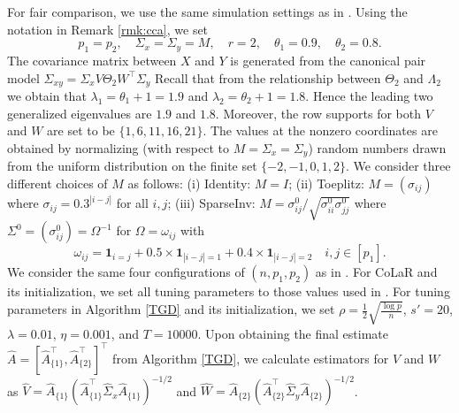 \documentclass[11pt]{article}
\newcommand{\nb}[1]{\textcolor{orange}{\texttt{[#1]}}}
\newcommand{\gsc}[1]{\textcolor{blue}{\texttt{[#1]}}}
\newcommand{\dc}[1]{\{#1\}} %
\newcommand{\hs}{s'}
\newcommand{\0}{{\mathbf{0}}}
\begin{document}
For fair comparison, we use the same simulation settings as in \cite{gao2017sparse}.
Using the notation in Remark \ref{rmk:cca},
we set 
\begin{equation*}
    p_1=p_2,\quad \Sigma_x=\Sigma_y=M,\quad r=2,\quad \theta_1=0.9,\quad \theta_2=0.8.
\end{equation*}
The covariance matrix between $X$ and $Y$ is generated from the canonical pair model $\Sigma_{xy}=\Sigma_xV \Theta_2 W^\top \Sigma_y$ 
{Recall that from the relationship between $\Theta_2$ and $\Lambda_2$ we obtain that $\lambda_1=\theta_1+1=1.9$ and $\lambda_2=\theta_2+1=1.8$. Hence the leading two generalized eigenvalues are $1.9$ and $1.8.$}
Moreover, the row supports for both $V$ and $W$ are set to be $\{1,6,11,16,21\}$. The values at the nonzero coordinates are obtained by normalizing (with respect to $M = \Sigma_x = \Sigma_y$) random numbers drawn from the uniform distribution on the finite set $\{-2,-1,0,1,2\}$. 
We consider three different choices of $M$ as follows: 
(i) Identity: $M=I$; 
(ii) Toeplitz: $M=(\sigma_{ij})$ where $\sigma_{ij}=0.3^{|i-j|}$ for all $i,j$; 
(iii) SparseInv: $M={\sigma^0_{ij}}/{\sqrt{\sigma_{ii}^0\sigma_{jj}^0}}$ where $\Sigma^0=(\sigma_{ij}^0)=\Omega^{-1}$ for $\Omega=\omega_{ij}$ with
\begin{equation*}
        \omega_{ij}=\mathbf{1}_{i=j}+0.5\times\mathbf{1}_{|i-j|=1}+0.4\times \mathbf{1}_{|i-j|=2}\quad i,j\in[p_1].
   \end{equation*}
We consider the same four configurations of $(n,p_1,p_2)$ as in \cite{gao2017sparse}. 
For CoLaR and its initialization, we set all tuning parameters to those values used in \cite{gao2017sparse}. 
For tuning parameters in Algorithm \ref{TGD} and its initialization, we set $\rho = \frac{1}{2}\sqrt{\frac{\log p}{n}}$,
$\hs=20$, $\lambda=0.01$, $\eta=0.001$, and $T=10000$.
Upon obtaining the final estimate $\widehat{A}=[\widehat{A}_{\dc{1}}^\top, \widehat{A}_{\dc{2}}^\top]^\top$ from Algorithm \ref{TGD}, 
we calculate estimators for $V$ and $W$ as $\widehat{V} = \widehat{A}_{\dc{1}}(\widehat{A}_{\dc{1}}^\top\widehat{\Sigma}_x\widehat{A}_{\dc{1}})^{-1/2}$ and $\widehat{W} = \widehat{A}_{\dc{2}}(\widehat{A}_{\dc{2}}^\top\widehat{\Sigma}_y\widehat{A}_{\dc{2}})^{-1/2}$.
\end{document}
